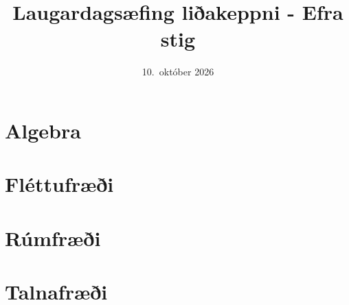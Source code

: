 \documentclass{article}
\title{Laugardagsæfing liðakeppni - Efra stig}
\date{10.\ október 2026}
\begin{document}
\maketitle

\section{Algebra}
\Problem
\Problem
\Problem
\Problem
\Problem

\newpage
\section{Fléttufræði}
\Problem
\Problem
\Problem
\Problem
\Problem

\newpage
\section{Rúmfræði}
\Problem
\Problem
\Problem
\Problem
\Problem

\newpage
\section{Talnafræði}
\Problem
\Problem
\Problem
\Problem
\Problem
\end{document}
